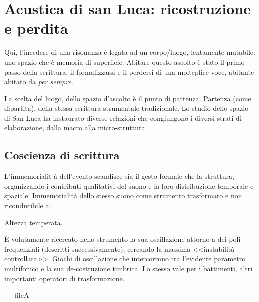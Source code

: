
\chapter{Acustica di san Luca: ricostruzione e perdita}
\label{cap:acustica}


%
%
%
%
Qui, l’incedere di una risonanza è legata ad un corpo/luogo, lentamente mutabile:
uno spazio che è memoria di superficie. Abitare questo ascolto è stato il primo
passo della scrittura, il formalizzarsi e il perdersi di una molteplice voce,
abitante abitato da \emph{per sempre}. 

La scelta del luogo, dello spazio d'ascolto è il punto di partenza.
Partenza (come dipartita), della stessa scrittura strumentale tradizionale. 
Lo studio dello spazio di San Luca ha instaurato diverse relazioni che
congiungono i diversi strati di elaborazione, dalla macro alla micro-struttura.
%
%
%
%
%
\section{Coscienza di scrittura}

L'immemorialit à dell'evento scandisce sia il gesto formale che la struttura,
organizzando i contributi qualitativi del suono e la loro distribuzione
temporale e spaziale. Immemorialità dello stesso suono come strumento trasformato
e non riconducibile a:

Altezza temperata.

È volutamente ricercato nello strumento la sua oscillazione  attorno a dei
poli frequenziali (descritti successivamente), cercando la massima <<instabilità-controllata>>.
Giochi di oscillazione che intercorrono tra l’evidente parametro multifonico e la sua de-costruzione timbrica.
Lo stesso vale per i battimenti, altri importanti operatori di trasformazione.


-----fileA------



